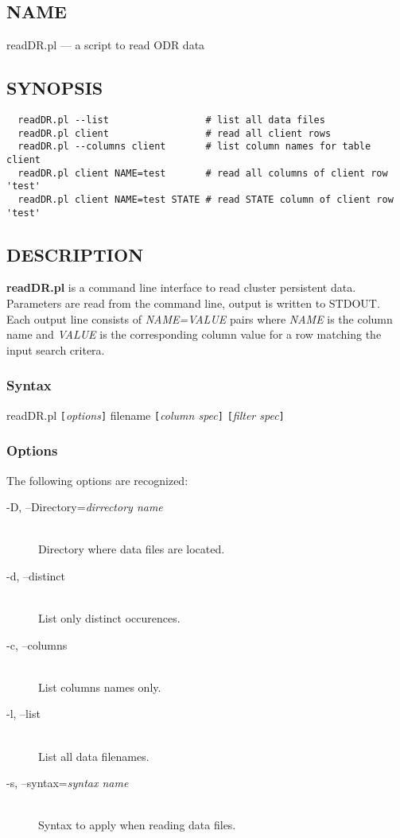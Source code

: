 \subsection*{NAME}
readDR.pl --- a script to read ODR data

\subsection*{SYNOPSIS}\begin{verbatim}
  readDR.pl --list                 # list all data files
  readDR.pl client                 # read all client rows
  readDR.pl --columns client       # list column names for table client
  readDR.pl client NAME=test       # read all columns of client row 'test'
  readDR.pl client NAME=test STATE # read STATE column of client row 'test'
\end{verbatim}

\subsection*{DESCRIPTION}
{\bf readDR.pl} is a command line interface to read cluster persistent data.
Parameters are read from the command line, output is written to STDOUT.
Each output line consists of {\em NAME=VALUE\/} pairs where {\em NAME\/} is the
column name and {\em VALUE\/} is the corresponding column value for a row
matching the input search critera.

\subsubsection*{Syntax}%

readDR.pl {\tt [}{\em options\/}{\tt ]} filename {\tt [}{\em column spec\/}{\tt ]} {\tt [}{\em filter spec\/}{\tt ]}

\subsubsection*{Options}%

The following options are recognized:

\begin{description}

\item[-D, --Directory={\em dirrectory name\/}]%
\hfil\\
Directory where data files are located.

\item[-d, --distinct]%
\hfil\\
List only distinct occurences.

\item[-c, --columns]%
\hfil\\
List columns names only.

\item[-l, --list]%
\hfil\\
List all data filenames.

\item[-s, --syntax={\em syntax name\/}]%
\hfil\\
Syntax to apply when reading data files.

\end{description}

